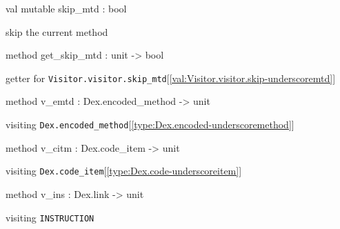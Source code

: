 \documentclass[11pt]{article}
\begin{document}
\begin{ocamldocobjectend}
\begin{ocamldocdescription}
\end{ocamldocdescription}


\label{val:Visitor.visitor.skip-underscoremtd}\begin{ocamldoccode}
val mutable skip_mtd : bool
\end{ocamldoccode}
\begin{ocamldocdescription}
skip the current method


\end{ocamldocdescription}


\label{method:Visitor.visitor.get-underscoreskip-underscoremtd}\begin{ocamldoccode}
method get_skip_mtd : unit -> bool
\end{ocamldoccode}
\begin{ocamldocdescription}
getter for {\tt{Visitor.visitor.skip\_mtd}}[\ref{val:Visitor.visitor.skip-underscoremtd}]


\end{ocamldocdescription}


\label{method:Visitor.visitor.v-underscoreemtd}\begin{ocamldoccode}
method v_emtd : Dex.encoded_method -> unit
\end{ocamldoccode}
\begin{ocamldocdescription}
visiting {\tt{Dex.encoded\_method}}[\ref{type:Dex.encoded-underscoremethod}]


\end{ocamldocdescription}


\label{method:Visitor.visitor.v-underscorecitm}\begin{ocamldoccode}
method v_citm : Dex.code_item -> unit
\end{ocamldoccode}
\begin{ocamldocdescription}
visiting {\tt{Dex.code\_item}}[\ref{type:Dex.code-underscoreitem}]


\end{ocamldocdescription}


\label{method:Visitor.visitor.v-underscoreins}\begin{ocamldoccode}
method v_ins : Dex.link -> unit
\end{ocamldoccode}
\begin{ocamldocdescription}
visiting {\tt{INSTRUCTION}}



\end{ocamldocdescription}
\end{ocamldocobjectend}
\end{document}
